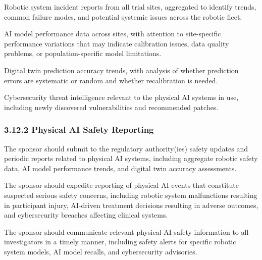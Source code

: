 \begin{description}[leftmargin=2.5cm,style=sameline]

\item[(a)] Robotic system incident reports from all trial sites, aggregated to identify trends, common failure modes, and potential systemic issues across the robotic fleet.

\item[(b)] AI model performance data across sites, with attention to site-specific performance variations that may indicate calibration issues, data quality problems, or population-specific model limitations.

\item[(c)] Digital twin prediction accuracy trends, with analysis of whether prediction errors are systematic or random and whether recalibration is needed.

\item[(d)] Cybersecurity threat intelligence relevant to the physical AI systems in use, including newly discovered vulnerabilities and recommended patches.

\end{description}

\subsubsection{3.12.2 Physical AI Safety Reporting}

\begin{description}[leftmargin=2.5cm,style=sameline]

\item[(a)] The sponsor should submit to the regulatory authority(ies) safety updates and periodic reports related to physical AI systems, including aggregate robotic safety data, AI model performance trends, and digital twin accuracy assessments.

\item[(b)] The sponsor should expedite reporting of physical AI events that constitute suspected serious safety concerns, including robotic system malfunctions resulting in participant injury, AI-driven treatment decisions resulting in adverse outcomes, and cybersecurity breaches affecting clinical systems.

\item[(c)] The sponsor should communicate relevant physical AI safety information to all investigators in a timely manner, including safety alerts for specific robotic system models, AI model recalls, and cybersecurity advisories.

\end{description}

